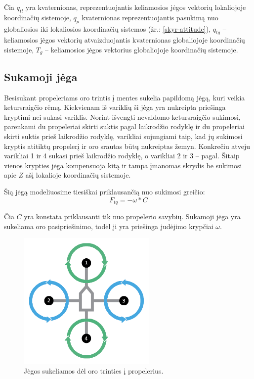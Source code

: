 \documentclass[12pt, a4paper, lithuanian, final]{article}
\begin{document}
Čia $q_{tl}$ yra kvaternionas, reprezentuojantis keliamosios jėgos vektorių lokaliojoje koordinačių sistemoje, $q_{p}$ kvaternionas reprezentuojantis pasukimą nuo globaliosios iki lokaliosios koordinačių sistemos (žr.: \ref{skyr-attitude}), $q_{tg}$ -- keliamosios jėgos vektorių atvaizduojantis kvaternionas globaliojoje koordinačių sistemoje, $T_g$ -- keliamosios jėgos vektorius globaliojoje koordinačių sistemoje.





\subsection{Sukamoji jėga}

Besisukant propeleriams oro trintis į mentes sukelia papildomą jėgą, kuri veikia ketursraigčio rėmą.
Kiekvienam iš variklių ši jėga yra nukreipta priešinga kryptimi nei sukasi variklis.
Norint išvengti nevaldomo ketursraigčio sukimosi, parenkami du propeleriai skirti suktis pagal laikrodžio rodyklę ir du propeleriai skirti suktis prieš laikrodžio rodyklę, varikliai sujungiami taip, kad jų sukimosi kryptis atitiktų propelerį ir oro srautas būtų nukreiptas žemyn.
Konkrečiu atveju varikliai 1 ir 4 sukasi prieš laikrodžio rodyklę, o varikliai 2 ir 3 -- pagal.
Šitaip vienos krypties jėga kompensuoja kitą ir tampa įmanomas skrydis be sukimosi apie $Z$ ašį lokalioje koordinačių sistemoje.

Šią jėgą modeliuosime tiesiškai priklausančią nuo sukimosi greičio:
\begin{equation}
	F_{tq} = -\omega * C
\end{equation}

Čia $C$ yra konstata priklausanti tik nuo propelerio savybių. Sukamoji jėga yra sukeliama oro pasipriešinimo, todėl ji yra priešinga judėjimo krypčiai $\omega$.


\begin{figure}[H]
\begin{center}
\includegraphics[width=0.6\textwidth]{img/quadcopter-torque.png}
\caption{Jėgos sukeliamos dėl oro trinties į propelerius.}
\end{center}
\end{figure}
\end{document}
